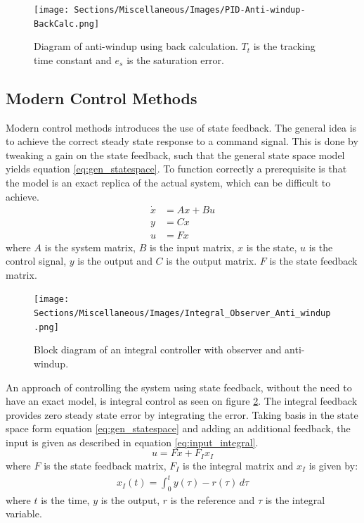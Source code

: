 \documentclass[../../main.tex]{subfiles}
\begin{document}
\begin{figure}
    \centering
    \texttt{[image: Sections/Miscellaneous/Images/PID-Anti-windup-BackCalc.png]}
    \caption{Diagram of anti-windup using back calculation. $T_t$ is the tracking time constant and $e_s$ is the saturation error.}
    \label{fig:anti-windup}
\end{figure}

\subsection*{Modern Control Methods}
Modern control methods introduces the use of state feedback. The general idea is to achieve the correct steady state response to a command signal. This is done by tweaking a gain on the state feedback, such that the general state space model yields equation \ref{eq:gen_statespace}. To function correctly a prerequisite is that the model is an exact replica of the actual system, which can be difficult to achieve.
\begin{equation}\label{eq:gen_statespace}
    \begin{split}
        \Dot{x}&=Ax+Bu \\
        y&=Cx \\
        u&=Fx
    \end{split}
\end{equation}
where $A$ is the system matrix, $B$ is the input matrix, $x$ is the state, $u$ is the control signal, $y$ is the output and $C$ is the output matrix. $F$ is the state feedback matrix. 

\begin{figure}
    \centering
    \texttt{[image: Sections/Miscellaneous/Images/Integral\_Observer\_Anti\_windup.png]}
    \caption{Block diagram of an integral controller with observer and anti-windup.}
    \label{fig:Integral_Observer_Diagram}
\end{figure}

An approach of controlling the system using state feedback, without the need to have an exact model, is integral control as seen on figure \ref{fig:Integral_Observer_Diagram}. The integral feedback provides zero steady state error by integrating the error. Taking basis in the state space form equation \ref{eq:gen_statespace} and adding an additional feedback, the input is given as described in equation \ref{eq:input_integral}.
\begin{equation}\label{eq:input_integral}
    u=Fx+F_Ix_I
\end{equation}
where $F$ is the state feedback matrix, $F_I$ is the integral matrix and $x_I$ is given by:
\begin{equation}
    \begin{split}
        x_I(t)=\int_0^t y(\tau)-r(\tau)\,d\tau
    \end{split}
\end{equation}
where $t$ is the time, $y$ is the output, $r$ is the reference and $\tau$ is the integral variable.
\end{document}
